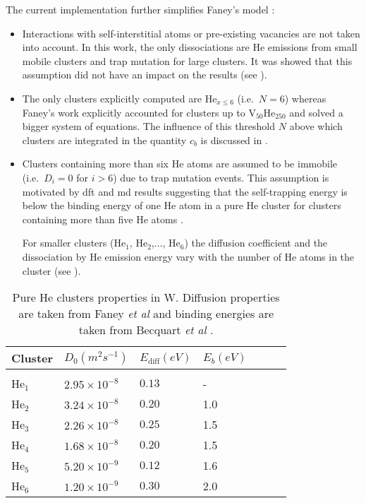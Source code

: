 The current implementation further simplifies Faney's model :
\begin{itemize}
    \item Interactions with \gls{self-interstitial} atoms or pre-existing vacancies are not taken into account.
    In this work, the only dissociations are He emissions from small mobile clusters and \gls{trap mutation} for large clusters.
    It was showed that this assumption did not have an impact on the results (see ).
    \item The only clusters explicitly computed are $\mathrm{He}_{x \leq 6}$ (i.e.\ $N=6$) whereas Faney's work explicitly accounted for clusters up to $\mathrm{V}_{50}\mathrm{He}_{250}$ and solved a bigger system of equations.
    The influence of this threshold $N$ above which clusters are integrated in the quantity $c_b$ is discussed in .
    \item Clusters containing more than six He atoms are assumed to be immobile (i.e.\ $D_i = 0$ for $i>6$) due to \gls{trap mutation} events.
    This assumption is motivated by \gls{dft} and \gls{md} results suggesting that the \gls{self-trapping} energy is below the binding energy of one He atom in a pure He cluster for clusters containing more than five He atoms .

    For smaller clusters ($\mathrm{He}_1$, $\mathrm{He}_2$,$\ldots$, $\mathrm{He}_6$) the diffusion coefficient and the dissociation by He emission energy vary with the number of He atoms in the cluster (see ).
\end{itemize}

\begin{table}
    \centering
    \begin{tabular}{L{1cm} R{2cm} R{1.6cm} R{1.1cm} R{1.6cm} R{1.1cm} R{2cm}}
        Cluster & $D_0 (\si{m^2 s^{-1}})$  & $E_\mathrm{diff} (\si{eV})$ &  $E_b (\si{eV})$   \\
        \hline
        \\
        He$_1$ & $2.95\times 10^{-8}$ & $0.13$ & - \\
        He$_2$ & $3.24\times 10^{-8}$ & $0.20$ & 1.0\\
        He$_3$ & $2.26\times 10^{-8}$ & $0.25$ & 1.5\\
        He$_4$ & $1.68\times 10^{-8}$ & $0.20$ & 1.5\\
        He$_5$ & $5.20\times 10^{-9}$ & $0.12$ & 1.6\\
        He$_6$ & $1.20\times 10^{-9}$ & $0.30$ & 2.0\\
    \end{tabular}
    \caption{Pure He clusters properties in W. Diffusion properties are taken from Faney \textit{et al} \cite{faney_spatially_2015} and binding energies are taken from Becquart \textit{et al} \cite{becquart_microstructural_2010}.}
\end{table}


